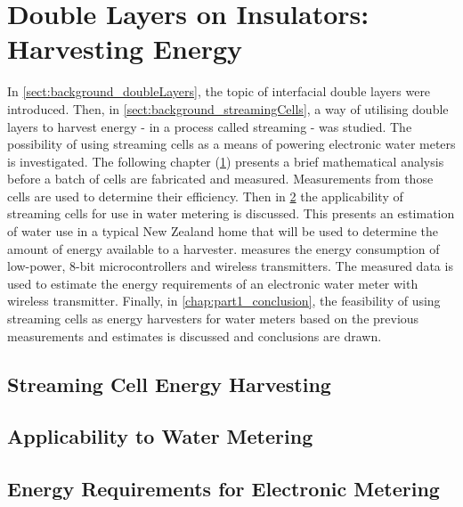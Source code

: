 
\part{Double Layers on Insulators: Harvesting Energy}
   \label{part:doubleLayersOnInsulators}

   In \cref{sect:background_doubleLayers}, the topic of interfacial double layers were introduced.
   Then, in \cref{sect:background_streamingCells}, a way of utilising double layers to harvest energy - in a process called streaming - was studied.
   The possibility of using streaming cells as a means of powering electronic water meters is investigated.
   The following chapter (\cref{chap:part1_streamingCellHarvesters}) presents a brief mathematical analysis before a batch of cells are fabricated and measured.
   Measurements from those cells are used to determine their efficiency.
   Then in \cref{chap:part1_waterMetering} the applicability of streaming cells for use in water metering is discussed.
   This presents an estimation of water use in a typical New Zealand home that will be used to determine the amount of energy available to a harvester.
    measures the energy consumption of low-power, 8-bit microcontrollers and wireless transmitters.
   The measured data is used to estimate the energy requirements of an electronic water meter with wireless transmitter.
   Finally, in \cref{chap:part1_conclusion}, the feasibility of using streaming cells as energy harvesters for water meters based on the previous measurements and estimates is discussed and conclusions are drawn.

   \chapter{Streaming Cell Energy Harvesting}
     \label{chap:part1_streamingCellHarvesters}
     


   \chapter{Applicability to Water Metering}
     \label{chap:part1_waterMetering}
     

   \chapter{Energy Requirements for Electronic Metering}
     \label{chap:part1_energyHarvestingRequirements}
     

